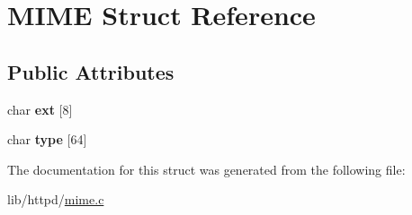 \hypertarget{structMIME}{}\section{M\+I\+ME Struct Reference}
\label{structMIME}
\subsection*{Public Attributes}
\begin{DoxyCompactItemize}
\item 
\mbox{\label{structMIME_a601909559c56e6453ae5cfc02453cc53}} 
char {\bfseries ext} \mbox{[}8\mbox{]}
\item 
\mbox{\label{structMIME_a827c7c2f660ab4ce4f25f96cf456591f}} 
char {\bfseries type} \mbox{[}64\mbox{]}
\end{DoxyCompactItemize}


The documentation for this struct was generated from the following file\+:\begin{DoxyCompactItemize}
\item 
lib/httpd/\hyperlink{mime_8c}{mime.\+c}\end{DoxyCompactItemize}
